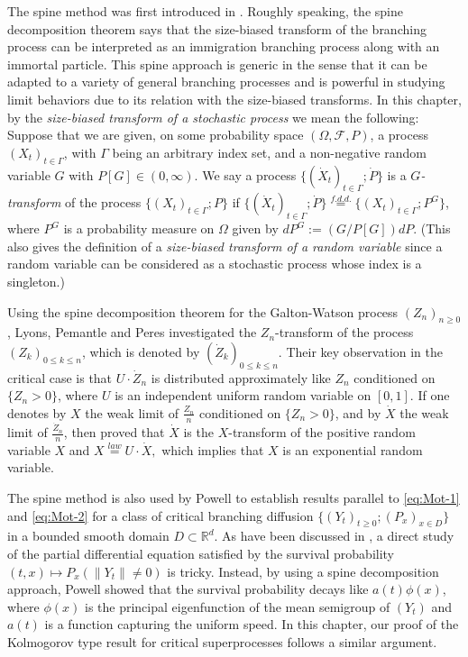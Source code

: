\documentclass[UTF8]{pkuthss}
\theoremstyle{plain}
\theoremstyle{definition}
\numberwithin{equation}{section}
\begin{document}
The spine method was first introduced in \cite{LyonsPemantlePeres1995Conceptual}.
	Roughly speaking, the spine decomposition theorem says that the size-biased transform of the branching process can be interpreted as an immigration branching process along with an immortal particle.
	This spine approach is generic in the sense that it can be adapted to a variety of general branching processes and is powerful in studying limit behaviors due to its relation with the size-biased transforms.
	In this chapter, by the \emph{size-biased transform of a stochastic process} we mean the following:
Suppose that we are given, on some probability space $(\Omega,\mathscr F,P)$, a process $(X_t)_{t\in \Gamma}$, with $\Gamma$ being an arbitrary index set, and a non-negative random variable $G$ with $ P[G] \in (0,\infty)$.
	We say a process $\{(\dot X_t)_{t\in \Gamma}; \dot P\}$ is a \emph{$G$-transform} of the process $\{(X_t)_{t\in \Gamma}; P\}$ if $\{(\dot X_t)_{t\in \Gamma}; \dot P\} \overset{f.d.d.}{=} \{(X_t)_{t\in \Gamma}; P^G\}$, where $P^G$ is a probability  measure on $\Omega$ given by $dP^G := (G/P[G]) dP$. 
	(This also gives the definition of a \emph{size-biased transform of a random variable} since a random variable can be considered as a stochastic process 
whose index is a singleton.)

	Using the spine decomposition theorem for the Galton-Watson process $(Z_n)_{n\geq 0}$, Lyons, Pemantle and Peres \cite{LyonsPemantlePeres1995Conceptual} investigated the $Z_n$-transform of the process $(Z_k)_{0\leq k\leq n}$, which is denoted by $(\dot Z_k)_{0\leq k\leq n}$.
	Their key observation in the critical case is that $U\cdot \dot Z_n$ is distributed approximately like $Z_n$ conditioned on $\{Z_n > 0\}$, where $U$ is an independent uniform random variable on $[0,1]$.
	If one denotes by $X$ the weak limit of $\frac{Z_n}{n}$ conditioned on $\{Z_n > 0\}$, and by $\dot X$  the weak limit of $\frac{\dot Z_n}{n}$, then \cite{LyonsPemantlePeres1995Conceptual} proved that $\dot X$ is the $X$-transform of the positive random variable $X$ and
$X\overset{law}{=} U \cdot \dot X,$
	which implies that $X$ is an exponential random variable.

    The spine method is also used by Powell \cite{Powell2019Invariance}
	to establish results parallel to \eqref{eq:Mot-1} and \eqref{eq:Mot-2} for a class of critical branching diffusion $\{(Y_t)_{t\geq 0}; (P_x)_{x\in D}\}$ in a bounded smooth domain $D\subset \mathbb R^d$.
	As have been discussed in \cite{Powell2019Invariance}, a direct study of the partial differential equation satisfied by the survival probability $(t,x) \mapsto P_{x}(\|Y_t\| \neq 0)$ is tricky.
	Instead, by using a spine decomposition approach, Powell \cite{Powell2019Invariance} showed that the survival probability decays like $a(t)\phi(x)$, where $\phi(x)$ is the principal eigenfunction of the mean semigroup of $(Y_t)$ and $a(t)$ is a function capturing the uniform speed.
	In this chapter, our proof of the Kolmogorov type result 
   for critical superprocesses follows a similar argument.
\end{document}
